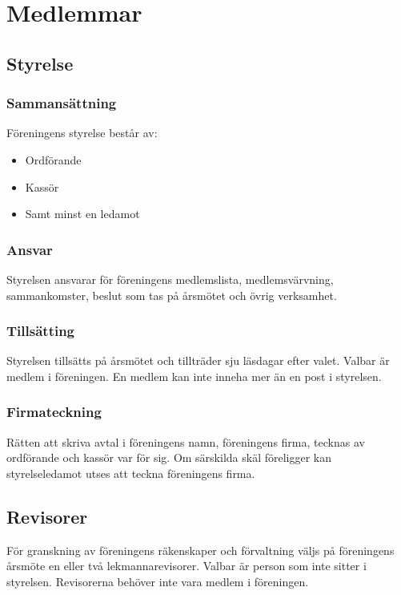 \section{Medlemmar}

\subsection{Styrelse} \label{sec:sammansättning-styrelse}

\subsubsection{Sammansättning} 

Föreningens styrelse består av:
\begin{itemize}
    \item Ordförande
    \item Kassör
    \item Samt minst en ledamot
\end{itemize}

\subsubsection{Ansvar}
Styrelsen ansvarar för föreningens medlemslista, medlemsvärvning, sammankomster, beslut som tas på årsmötet och övrig verksamhet.

\subsubsection{Tillsätting}
Styrelsen tillsätts på årsmötet och tillträder sju läsdagar efter valet. Valbar är medlem i föreningen. En medlem kan inte inneha mer än en post i styrelsen.

\subsubsection{Firmateckning}
Rätten att skriva avtal i föreningens namn, föreningens firma, tecknas av ordförande och kassör var för sig. Om särskilda skäl föreligger kan styrelseledamot utses att teckna föreningens firma.




\subsection{Revisorer}
För granskning av föreningens räkenskaper och förvaltning väljs på föreningens årsmöte en eller två lekmannarevisorer. Valbar är person som inte sitter i styrelsen. Revisorerna behöver inte vara medlem i föreningen.




